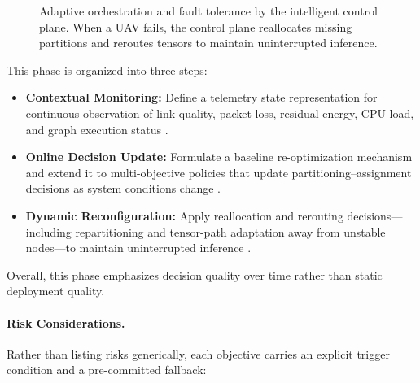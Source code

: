 \begin{figure}[H]
  \centering
  \resizebox{1\textwidth}{!}{}
  \caption{Adaptive orchestration and fault tolerance by the intelligent control plane. When a UAV fails, the control plane reallocates missing partitions and reroutes tensors to maintain uninterrupted inference.}
  \label{fig:fault_tolerance}
\end{figure}

This phase is organized into three steps:
\begin{itemize}
  \item \textbf{Contextual Monitoring:} Define a telemetry state representation for continuous observation of link quality, packet loss, residual energy, CPU load, and graph execution status \cite{qu2024elastic,mcenroe2022survey}.
  \item \textbf{Online Decision Update:} Formulate a baseline re-optimization mechanism and extend it to multi-objective policies that update partitioning--assignment decisions as system conditions change \cite{pan2025selfhealing,jamshidi2025resilient}.
  \item \textbf{Dynamic Reconfiguration:} Apply reallocation and rerouting decisions---including repartitioning and tensor-path adaptation away from unstable nodes---to maintain uninterrupted inference \cite{pan2025selfhealing,blanquer2024resilient,hosseinzadeh2024local}.
\end{itemize}

Overall, this phase emphasizes decision quality over time rather than static deployment quality.

\paragraph{Risk Considerations.}
Rather than listing risks generically, each objective carries an explicit trigger condition and a pre-committed fallback:

